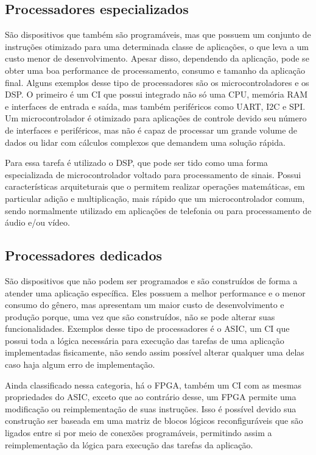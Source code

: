     \subsection{Processadores especializados } São dispositivos que também são programáveis, mas que possuem um conjunto de instruções otimizado para uma determinada classe de aplicações, o que leva a um custo menor de desenvolvimento. Apesar disso,  dependendo da aplicação, pode se obter uma boa performance de processamento, consumo e tamanho da aplicação final. Alguns exemplos desse tipo de processadores são os microcontroladores e os \gls{DSP}. O primeiro é um \gls{CI} que possui integrado não só uma \gls{CPU}, memória \gls{RAM} e interfaces de entrada e saída, mas também periféricos como \gls{UART}, \gls{I2C} e \gls{SPI}. Um microcontrolador é otimizado para aplicações de controle devido seu número de interfaces e periféricos, mas não é capaz de processar um grande volume de dados ou lidar com cálculos complexos que demandem uma solução rápida.
    
    Para essa tarefa é utilizado o \gls{DSP}, que pode ser tido como uma forma especializada de microcontrolador voltado para processamento de sinais. Possui características arquiteturais que o permitem realizar operações matemáticas, em particular adição e multiplicação, mais rápido que um microcontrolador comum, sendo normalmente utilizado em aplicações de telefonia ou para processamento de áudio e/ou vídeo.
    
    
    \subsection{Processadores dedicados } São dispositivos que não podem ser programados e são construídos de forma a atender uma aplicação específica. Eles possuem a melhor performance e o menor consumo do gênero, mas apresentam um maior custo de desenvolvimento e produção porque, uma vez que são construídos, não se pode alterar suas funcionalidades. Exemplos desse tipo de processadores é o \gls{ASIC}, um \gls{CI} que possui toda a lógica necessária para execução das tarefas de uma aplicação implementadas fisicamente, não sendo assim possível alterar qualquer uma delas caso haja algum erro de implementação. 
    
    Ainda classificado nessa categoria, há o \gls{FPGA}, também um \gls{CI} com as mesmas propriedades do \gls{ASIC}, exceto que ao contrário desse, um \gls{FPGA} permite uma modificação ou reimplementação de suas instruções. Isso é possível devido sua construção ser baseada em uma matriz de blocos lógicos reconfiguráveis que são ligados entre si por meio de conexões programáveis, permitindo assim a reimplementação da lógica para execução das tarefas da aplicação.



